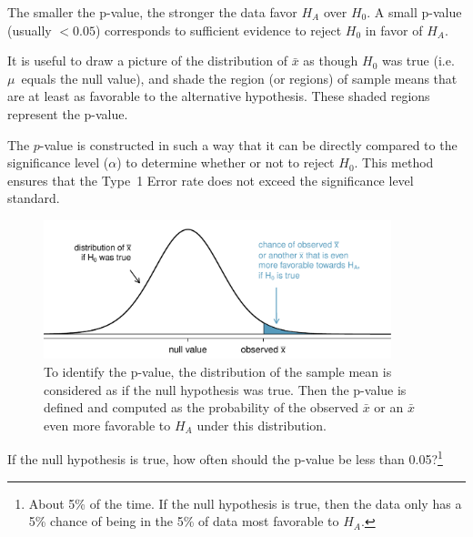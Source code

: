 \begin{spacing}{1.5}
\begin{termBox}{
The smaller the p-value, the stronger the data favor $H_A$ over $H_0$. A small p-value (usually $<0.05$) corresponds to sufficient evidence to reject $H_0$ in favor of $H_A$.}
\end{termBox}

\begin{tipBox}{
It is useful to draw a picture of the distribution of $\bar{x}$ as though $H_0$ was true (i.e.~$\mu$~equals the null value), and shade the region (or regions) of sample means that are at least as favorable to the alternative hypothesis. These shaded regions represent the p-value.}
\end{tipBox}


The $p$-value is constructed in such a way that it can be directly compared to the significance level ($\alpha$) to determine whether or not to reject $H_0$. This method ensures that the Type~1 Error rate does not exceed the significance level standard. 

\begin{figure}[ht]
   \centering
   \includegraphics[width=0.9\textwidth]
{ch_inference_foundations_oi_biostat/figures/pValueOneSidedSleepStudyExplained/pValueOneSidedSleepStudyExplained}
   \caption{To identify the p-value, the distribution of the sample mean is considered as if the null hypothesis was true. Then the p-value is defined and computed as the probability of the observed $\bar{x}$ or an $\bar{x}$ even more favorable to $H_A$ under this distribution.}
   \label{pValueOneSidedSleepStudyExplained}
\end{figure}

\begin{exercise}
If the null hypothesis is true, how often should the p-value be less than 0.05?\footnote{About 5\% of the time. If the null hypothesis is true, then the data only has a 5\% chance of being in the 5\% of data most favorable to $H_A$.}
\end{exercise}


\end{spacing}
